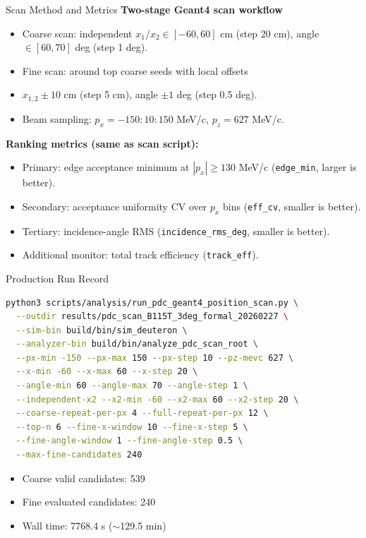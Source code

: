 \documentclass[aspectratio=169]{beamer}
\begin{document}
\begin{frame}[fragile]{Scan Method and Metrics}
    \textbf{Two-stage Geant4 scan workflow}
    \begin{itemize}
        \item Coarse scan: independent $x_1/x_2 \in [-60,60]$ cm (step 20 cm), angle $\in [60,70]$ deg (step 1 deg).
        \item Fine scan: around top coarse seeds with local offsets
        \item $x_{1,2}\pm 10$ cm (step 5 cm), angle $\pm 1$ deg (step 0.5 deg).
        \item Beam sampling: $p_x=-150:10:150$ MeV/c, $p_z=627$ MeV/c.
    \end{itemize}
    \vspace{0.2cm}
    \textbf{Ranking metrics (same as scan script):}
    \begin{itemize}
        \item Primary: edge acceptance minimum at $|p_x|\ge 130$ MeV/c (\texttt{edge\_min}, larger is better).
        \item Secondary: acceptance uniformity CV over $p_x$ bins (\texttt{eff\_cv}, smaller is better).
        \item Tertiary: incidence-angle RMS (\texttt{incidence\_rms\_deg}, smaller is better).
        \item Additional monitor: total track efficiency (\texttt{track\_eff}).
    \end{itemize}
\end{frame}

\begin{frame}[fragile]{Production Run Record}
\begin{lstlisting}[language=bash]
python3 scripts/analysis/run_pdc_geant4_position_scan.py \
  --outdir results/pdc_scan_B115T_3deg_formal_20260227 \
  --sim-bin build/bin/sim_deuteron \
  --analyzer-bin build/bin/analyze_pdc_scan_root \
  --px-min -150 --px-max 150 --px-step 10 --pz-mevc 627 \
  --x-min -60 --x-max 60 --x-step 20 \
  --angle-min 60 --angle-max 70 --angle-step 1 \
  --independent-x2 --x2-min -60 --x2-max 60 --x2-step 20 \
  --coarse-repeat-per-px 4 --full-repeat-per-px 12 \
  --top-n 6 --fine-x-window 10 --fine-x-step 5 \
  --fine-angle-window 1 --fine-angle-step 0.5 \
  --max-fine-candidates 240
\end{lstlisting}
\vspace{-0.2cm}
\begin{itemize}
    \item Coarse valid candidates: 539
    \item Fine evaluated candidates: 240
    \item Wall time: 7768.4 s ($\sim$129.5 min)
\end{itemize}
\end{frame}
\end{document}
